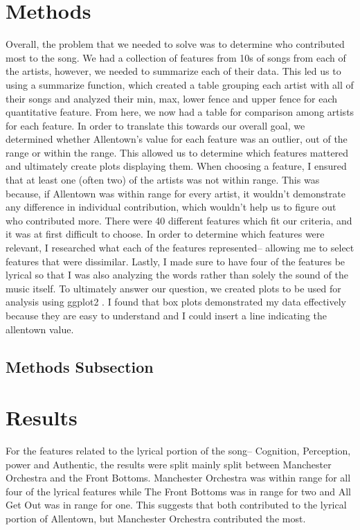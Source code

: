 \documentclass{article}\usepackage[]{graphicx}\usepackage[]{xcolor}
\begin{document}
\begin{multicols}{2}
\section{Methods}
  Overall, the problem that we needed to solve was to determine who contributed most to the song. We had a collection of features from 10s of songs from each of the artists, however, we needed to summarize each of their data. This led us to using a summarize function, which created a table grouping each artist with all of their songs and analyzed their min, max, lower fence and upper fence for each quantitative feature. From here, we now had a table for comparison among artists for each feature. In order to translate this towards our overall goal, we determined whether Allentown's value for each feature was an outlier, out of the range or within the range. This allowed us to determine which features mattered and ultimately create plots displaying them. 
  When choosing a feature, I ensured that at least one (often two) of the artists was not within range. This was because, if Allentown was within range for every artist, it wouldn't demonstrate any difference in individual contribution, which wouldn't help us to figure out who contributed more. There were 40 different features which fit our criteria, and it was at first difficult to choose. 
  In order to determine which features were relevant, I researched what each of the features represented-- allowing me to select features that were dissimilar. Lastly, I made sure to have four of the features be lyrical so that I was also analyzing the words rather than solely the sound of the music itself.
  To ultimately answer our question, we created plots to be used for analysis using ggplot2 \citep{ggplot2}. I found that box plots demonstrated my data effectively because they are easy to understand and I could insert a line indicating the allentown value.
  
  

\subsection{Methods Subsection}
\section{Results}
  For the features related to the lyrical portion of the song-- Cognition, Perception, power and Authentic, the results were split mainly split between Manchester Orchestra and the Front Bottoms. Manchester Orchestra was within range for all four of the lyrical features while The Front Bottoms was in range for two and All Get Out was in range for one. This suggests that both contributed to the lyrical portion of Allentown, but Manchester Orchestra contributed the most. 
  

\end{multicols}
\end{document}
